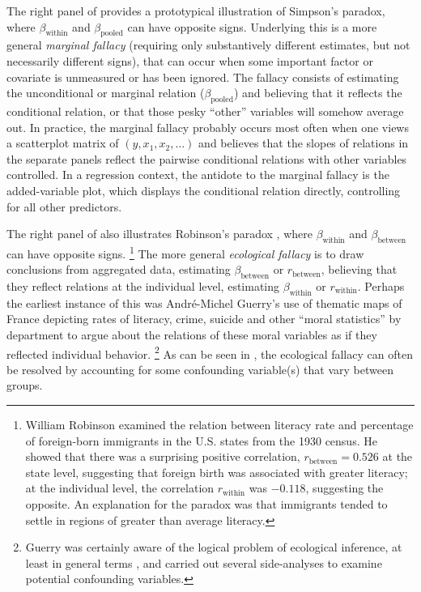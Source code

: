 The right panel of  provides a prototypical illustration of Simpson's paradox,
where $\beta_{\textrm{within}}$ and $\beta_{\textrm{pooled}}$ can have opposite signs. Underlying this is a
more general \emph{marginal fallacy} (requiring only substantively different estimates, but not necessarily
different signs), 
that can occur when some important factor or covariate is unmeasured
or has been ignored. The fallacy consists of estimating the unconditional or marginal
relation ($\beta_{\textrm{pooled}}$) and believing that it reflects the conditional relation, or that
those pesky ``other'' variables will somehow average out. In practice, the marginal fallacy probably occurs most
often when one views a scatterplot matrix of $(y, x_1, x_2, \dots)$ and believes that the slopes of
relations in the separate panels reflect the pairwise conditional relations with other variables
controlled. In a regression context, the antidote to the marginal fallacy is the added-variable
plot, which displays the conditional relation directly, controlling for all other predictors.

The right panel of  also illustrates Robinson's paradox \citep{Robinson:1950},
where $\beta_{\textrm{within}}$ and $\beta_{\textrm{between}}$ can have opposite signs.%
\footnote{
William Robinson \citeyearpar{Robinson:1950} examined the relation between literacy rate and percentage
of foreign-born immigrants in the U.S. states from the 1930 census.  
He showed that there was a surprising
positive correlation, $r_{\textrm{between}}= 0.526$ at the state level,
suggesting that foreign birth was associated with greater literacy;
at the individual level, the correlation $r_{\textrm{within}}$ was $-0.118$, suggesting the opposite.
An explanation for the paradox was that immigrants tended to settle in regions of greater than
average literacy.
}
The more general \emph{ecological fallacy} \citep{Freedman:01}
is to draw conclusions from aggregated data, estimating
$\beta_{\textrm{between}}$ or $r_{\textrm{between}}$, believing that they reflect relations
at the individual level, estimating $\beta_{\textrm{within}}$ or $r_{\textrm{within}}$.
Perhaps the earliest instance of this was Andr\'e-Michel Guerry's \citeyearpar{Guerry:1833} use of thematic maps of
France depicting rates of literacy, crime, suicide and other ``moral statistics'' by department to argue 
about the relations of these moral variables as if they reflected individual behavior.%
\footnote{
Guerry was certainly aware of the logical problem of ecological inference, at least in general terms
\citep{Friendly:07:guerry}, and carried out several side-analyses to examine potential confounding
variables.  
}
As can be seen in , the ecological fallacy can often be resolved
by accounting for some confounding variable(s) that vary between groups.

